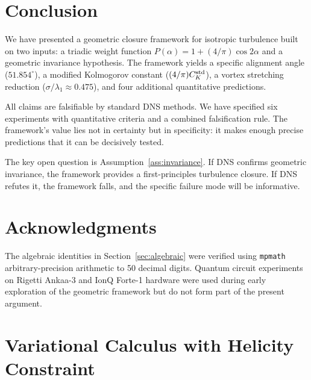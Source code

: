 \documentclass[12pt,a4paper]{article}
\begin{document}
\section{Conclusion}
\label{sec:conclusion}

We have presented a geometric closure framework for isotropic turbulence built on two inputs: a triadic weight function $P(\alpha) = 1 + (4/\pi)\cos 2\alpha$ and a geometric invariance hypothesis.
The framework yields a specific alignment angle ($51.854^\circ$), a modified Kolmogorov constant ($(4/\pi)C_K^{\rm std}$), a vortex stretching reduction ($\sigma/\lambda_1 \approx 0.475$), and four additional quantitative predictions.

All claims are falsifiable by standard DNS methods.
We have specified six experiments with quantitative criteria and a combined falsification rule.
The framework's value lies not in certainty but in specificity: it makes enough precise predictions that it can be decisively tested.

The key open question is Assumption~\ref{ass:invariance}.
If DNS confirms geometric invariance, the framework provides a first-principles turbulence closure.
If DNS refutes it, the framework falls, and the specific failure mode will be informative.

\section*{Acknowledgments}
The algebraic identities in Section~\ref{sec:algebraic} were verified using \texttt{mpmath} arbitrary-precision arithmetic to 50 decimal digits.
Quantum circuit experiments on Rigetti Ankaa-3 and IonQ Forte-1 hardware were used during early exploration of the geometric framework but do not form part of the present argument.

\appendix

\section{Variational Calculus with Helicity Constraint}
\label{app:helicity}
\end{document}
